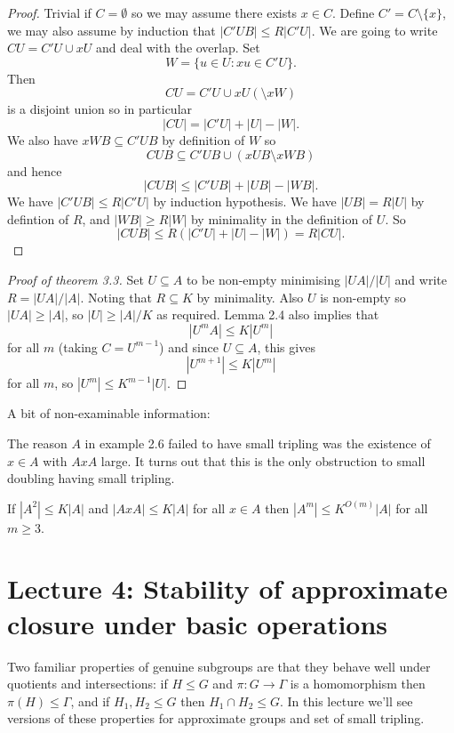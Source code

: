\documentclass[a4paper]{article}
\begin{document}
\begin{proof}
  Trivial if \(C = \emptyset\) so we may assume there exists \(x \in C\). Define \(C' = C \setminus \{x\}\), we may also assume by induction that \(|C'UB| \leq R|C'U|\). We are going to write \(CU = C'U \cup xU\) and deal with the overlap. Set
  \[
    W = \{u \in U: xu \in C'U\}.
  \]
  Then
  \[
    CU = C'U \cup xU (\setminus xW)
  \]
  is a disjoint union so in particular
  \[
    |CU| = |C'U| + |U| - |W|.
  \]
  We also have \(xWB \subseteq C'UB\) by definition of \(W\) so
  \[
    CUB \subseteq C'UB \cup (xUB \setminus xWB)
  \]
  and hence
  \[
    |CUB| \leq |C'UB| + |UB| - |WB|.
  \]
  We have \(|C'UB| \leq R|C'U|\) by induction hypothesis. We have \(|UB| = R|U|\) by defintion of \(R\), and \(|WB| \geq R|W|\) by minimality in the definition of \(U\). So
  \[
    |CUB|
    \leq R(|C'U| + |U| - |W|)
    = R|CU|.
  \]
\end{proof}

\begin{proof}[Proof of theorem 3.3]
  Set \(U \subseteq A\) to be non-empty minimising \(|UA|/|U|\) and write \(R = |UA|/|A|\). Noting that \(R \subseteq K\) by minimality. Also \(U\) is non-empty so \(|UA| \geq |A|\), so \(|U| \geq |A|/K\) as required. Lemma 2.4 also implies that
  \[
    |U^mA| \leq K|U^m|
  \]
  for all \(m\) (taking \(C = U^{m - 1}\)) and since \(U \subseteq A\), this gives
  \[
    |U^{m + 1}| \leq K |U^m|
  \]
  for all \(m\), so \(|U^m| \leq K^{m - 1} |U|\).
\end{proof}

A bit of non-examinable information:

The reason \(A\) in example 2.6 failed to have small tripling was the existence of \(x \in A\) with \(AxA\) large. It turns out that this is the only obstruction to small doubling having small tripling.

\begin{theorem}
  If \(|A^2| \leq K|A|\) and \(|AxA| \leq K|A|\) for all \(x \in A\) then \(|A^m| \leq K^{O(m)}|A|\) for all \(m \geq 3\).
\end{theorem}

\section*{Lecture 4: Stability of approximate closure under basic operations}

Two familiar properties of genuine subgroups are that they behave well under quotients and intersections: if \(H \leq G\) and \(\pi: G \to \Gamma\) is a homomorphism then \(\pi(H) \leq \Gamma\), and if \(H_1, H_2 \leq G\) then \(H_1 \cap H_2 \leq G\). In this lecture we'll see versions of these properties for approximate groups and set of small tripling.
\end{document}
